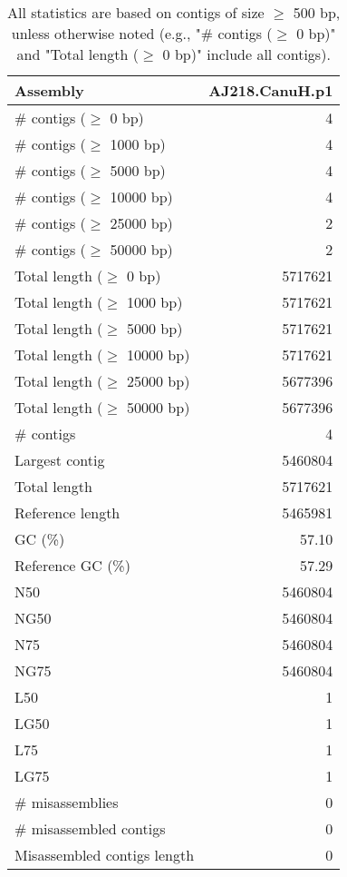 \documentclass[12pt,a4paper]{article}
\begin{document}
\begin{table}[ht]
\begin{center}
\caption{All statistics are based on contigs of size $\geq$ 500 bp, unless otherwise noted (e.g., "\# contigs ($\geq$ 0 bp)" and "Total length ($\geq$ 0 bp)" include all contigs).}
\begin{tabular}{|l*{1}{|r}|}
\hline
Assembly & AJ218.CanuH.p1 \\ \hline
\# contigs ($\geq$ 0 bp) & 4 \\ \hline
\# contigs ($\geq$ 1000 bp) & 4 \\ \hline
\# contigs ($\geq$ 5000 bp) & 4 \\ \hline
\# contigs ($\geq$ 10000 bp) & 4 \\ \hline
\# contigs ($\geq$ 25000 bp) & 2 \\ \hline
\# contigs ($\geq$ 50000 bp) & 2 \\ \hline
Total length ($\geq$ 0 bp) & 5717621 \\ \hline
Total length ($\geq$ 1000 bp) & 5717621 \\ \hline
Total length ($\geq$ 5000 bp) & 5717621 \\ \hline
Total length ($\geq$ 10000 bp) & 5717621 \\ \hline
Total length ($\geq$ 25000 bp) & 5677396 \\ \hline
Total length ($\geq$ 50000 bp) & 5677396 \\ \hline
\# contigs & 4 \\ \hline
Largest contig & 5460804 \\ \hline
Total length & 5717621 \\ \hline
Reference length & 5465981 \\ \hline
GC (\%) & 57.10 \\ \hline
Reference GC (\%) & 57.29 \\ \hline
N50 & 5460804 \\ \hline
NG50 & 5460804 \\ \hline
N75 & 5460804 \\ \hline
NG75 & 5460804 \\ \hline
L50 & 1 \\ \hline
LG50 & 1 \\ \hline
L75 & 1 \\ \hline
LG75 & 1 \\ \hline
\# misassemblies & 0 \\ \hline
\# misassembled contigs & 0 \\ \hline
Misassembled contigs length & 0 \\ \hline

\end{tabular}
\end{center}
\end{table}
\end{document}
